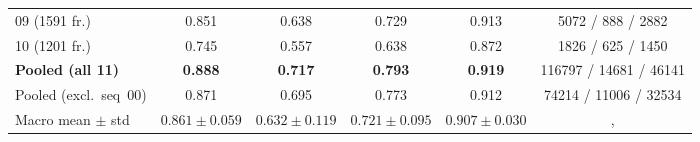 \documentclass[a4paper,12pt]{report}
\begin{document}
\begin{table}[H]
\begin{tabular}{lccccc}
    09 (\num{1591} fr.) & 0.851 & 0.638 & 0.729 & 0.913 & \num{5072} / \num{888} / \num{2882} \\
    10 (\num{1201} fr.) & 0.745 & 0.557 & 0.638 & 0.872 & \num{1826} / \num{625} / \num{1450} \\
    \midrule
    \textbf{Pooled (all 11)} & \textbf{0.888} & \textbf{0.717} & \textbf{0.793} & \textbf{0.919} & \num{116797} / \num{14681} / \num{46141} \\
    Pooled (excl.\ seq~00)   & 0.871 & 0.695 & 0.773 & 0.912 & \num{74214} / \num{11006} / \num{32534} \\
    Macro mean $\pm$ std     & $0.861{\pm}0.059$ & $0.632{\pm}0.119$ & $0.721{\pm}0.095$ & $0.907{\pm}0.030$ &, \\
    \bottomrule
  \end{tabular}
\end{table}
\end{document}
